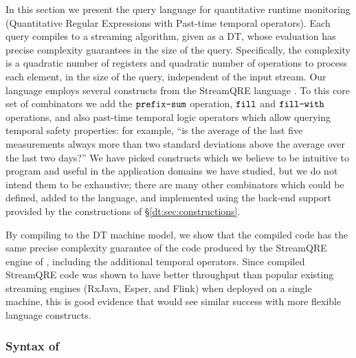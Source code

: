 In this section we present the \QREpast{} query language for quantitative runtime monitoring (Quantitative Regular Expressions with Past-time temporal operators). Each query compiles to a streaming algorithm, given as a DT, whose evaluation has precise complexity guarantees in the size of the query. Specifically, the complexity is a quadratic number of registers and quadratic number of operations to process each element, in the size of the query, independent of the input stream. Our language employs several constructs from the StreamQRE language \cite{MRAIK2017SQRE}. To this core set of combinators we add the $\texttt{prefix-sum}$ operation, $\texttt{fill}$ and $\texttt{fill-with}$ operations, and also past-time temporal logic operators which allow querying temporal safety properties: for example, ``is the average of the last five measurements always more than two standard deviations above the average over the last two days?''
We have picked constructs which we believe to be intuitive to program and useful in the application domains we have studied, but we do not intend them to be exhaustive; there are many other combinators which could be defined, added to the language, and implemented using the back-end support provided by the constructions of \S\ref{dt:sec:constructions}.

By compiling to the DT machine model, we show that the compiled code has the same precise complexity guarantee of the code produced by the StreamQRE engine of \cite{MRAIK2017SQRE}, including the additional temporal operators. Since compiled StreamQRE code was shown to have better throughput than popular existing streaming engines (RxJava, Esper, and Flink) when deployed on a single machine, this is good evidence that \QREpast{} would see similar success with more flexible language constructs.

\subsubsection{Syntax of \QREpast}
\label{dt:subsec:rm-syntax}

